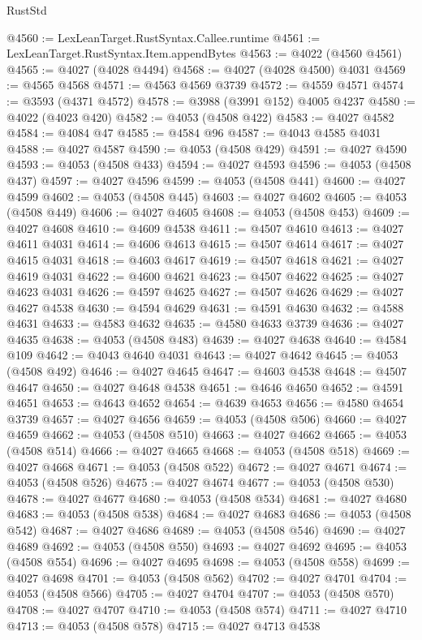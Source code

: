 \begin{lexlean}{RustStd}
\begin{coremodule}
@4560 := LexLeanTarget.RustSyntax.Callee.runtime
@4561 := LexLeanTarget.RustSyntax.Item.appendBytes
@4563 := @4022 (@4560 @4561)
@4565 := @4027 (@4028 @4494)
@4568 := @4027 (@4028 @4500) @4031
@4569 := @4565 @4568
@4571 := @4563 @4569 @3739
@4572 := @4559 @4571
@4574 := @3593 (@4371 @4572)
@4578 := @3988 (@3991 @152) @4005 @4237
@4580 := @4022 (@4023 @420)
@4582 := @4053 (@4508 @422)
@4583 := @4027 @4582
@4584 := @4084 @47
@4585 := @4584 @96
@4587 := @4043 @4585 @4031
@4588 := @4027 @4587
@4590 := @4053 (@4508 @429)
@4591 := @4027 @4590
@4593 := @4053 (@4508 @433)
@4594 := @4027 @4593
@4596 := @4053 (@4508 @437)
@4597 := @4027 @4596
@4599 := @4053 (@4508 @441)
@4600 := @4027 @4599
@4602 := @4053 (@4508 @445)
@4603 := @4027 @4602
@4605 := @4053 (@4508 @449)
@4606 := @4027 @4605
@4608 := @4053 (@4508 @453)
@4609 := @4027 @4608
@4610 := @4609 @4538
@4611 := @4507 @4610
@4613 := @4027 @4611 @4031
@4614 := @4606 @4613
@4615 := @4507 @4614
@4617 := @4027 @4615 @4031
@4618 := @4603 @4617
@4619 := @4507 @4618
@4621 := @4027 @4619 @4031
@4622 := @4600 @4621
@4623 := @4507 @4622
@4625 := @4027 @4623 @4031
@4626 := @4597 @4625
@4627 := @4507 @4626
@4629 := @4027 @4627 @4538
@4630 := @4594 @4629
@4631 := @4591 @4630
@4632 := @4588 @4631
@4633 := @4583 @4632
@4635 := @4580 @4633 @3739
@4636 := @4027 @4635
@4638 := @4053 (@4508 @483)
@4639 := @4027 @4638
@4640 := @4584 @109
@4642 := @4043 @4640 @4031
@4643 := @4027 @4642
@4645 := @4053 (@4508 @492)
@4646 := @4027 @4645
@4647 := @4603 @4538
@4648 := @4507 @4647
@4650 := @4027 @4648 @4538
@4651 := @4646 @4650
@4652 := @4591 @4651
@4653 := @4643 @4652
@4654 := @4639 @4653
@4656 := @4580 @4654 @3739
@4657 := @4027 @4656
@4659 := @4053 (@4508 @506)
@4660 := @4027 @4659
@4662 := @4053 (@4508 @510)
@4663 := @4027 @4662
@4665 := @4053 (@4508 @514)
@4666 := @4027 @4665
@4668 := @4053 (@4508 @518)
@4669 := @4027 @4668
@4671 := @4053 (@4508 @522)
@4672 := @4027 @4671
@4674 := @4053 (@4508 @526)
@4675 := @4027 @4674
@4677 := @4053 (@4508 @530)
@4678 := @4027 @4677
@4680 := @4053 (@4508 @534)
@4681 := @4027 @4680
@4683 := @4053 (@4508 @538)
@4684 := @4027 @4683
@4686 := @4053 (@4508 @542)
@4687 := @4027 @4686
@4689 := @4053 (@4508 @546)
@4690 := @4027 @4689
@4692 := @4053 (@4508 @550)
@4693 := @4027 @4692
@4695 := @4053 (@4508 @554)
@4696 := @4027 @4695
@4698 := @4053 (@4508 @558)
@4699 := @4027 @4698
@4701 := @4053 (@4508 @562)
@4702 := @4027 @4701
@4704 := @4053 (@4508 @566)
@4705 := @4027 @4704
@4707 := @4053 (@4508 @570)
@4708 := @4027 @4707
@4710 := @4053 (@4508 @574)
@4711 := @4027 @4710
@4713 := @4053 (@4508 @578)
@4715 := @4027 @4713 @4538

\end{coremodule}
\end{lexlean}
